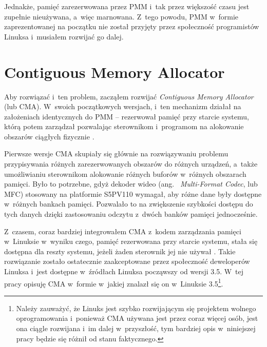 Jednakże, pamięć zarezerwowana przez PMM i~tak przez większość czasu
jest zupełnie nieużywana, a~więc marnowana.  Z~tego powodu, PMM
w~formie zaprezentowanej na początku nie został przyjęty przez
społeczność programistów Linuksa i~musiałem rozwijać go dalej.

\section{Contiguous Memory Allocator}\label{sec:cma}

Aby rozwiązać i~ten problem, zacząłem rozwijać {\it Contiguous Memory
  Allocator} (lub CMA).  W~swoich początkowych wersjach, i~ten
mechanizm działał na założeniach identycznych do PMM -- rezerwował
pamięć przy starcie systemu, którą potem zarządzał pozwalając
sterownikom i~programom na alokowanie obszarów ciągłych fizycznie
\cite{patch:cma-4}.

Pierwsze wersje CMA skupiały się głównie na rozwiązywaniu problemu
przypisywania różnych zarezerwowanych obszarów do różnych urządzeń,
a~także umożliwianiu sterownikom alokowanie różnych buforów w~różnych
obszarach pamięci.  Było to potrzebne, gdyż dekoder wideo (ang.\ {\it
  Multi-Format Codec}, lub MFC) stosowany na platformie S5PV110
wymagał, aby różne dane były dostępne w~różnych bankach pamięci.
Pozwalało to na zwiększenie szybkości dostępu do tych danych dzięki
zastosowaniu odczytu z~dwóch banków pamięci jednocześnie.

Z~czasem, coraz bardziej integrowałem CMA z~kodem zarządzania pamięci
w~Linuksie w~wyniku czego, pamięć rezerwowana przy starcie systemu,
stała się dostępna dla reszty systemu, jeżeli żaden sterownik jej nie
używał \cite{patch:cma-24}.  Takie rozwiązanie zostało ostatecznie
zaakceptowane przez społeczność deweloperów Linuksa i~jest dostępne
w~źródłach Linuksa począwszy od wersji 3.5.  W~tej pracy opisuję CMA
w~formie w~jakiej znalazł się on w~Linuksie 3.5\footnote{Należy
  zauważyć, że Linuks jest szybko rozwijającym się projektem wolnego
  oprogramowania i~ponieważ CMA używana jest przez coraz więcej osób,
  jest ona ciągle rozwijana i~im dalej w~przyszłość, tym bardziej opis
  w~niniejszej pracy będzie się różnił od stanu faktycznego.}.
